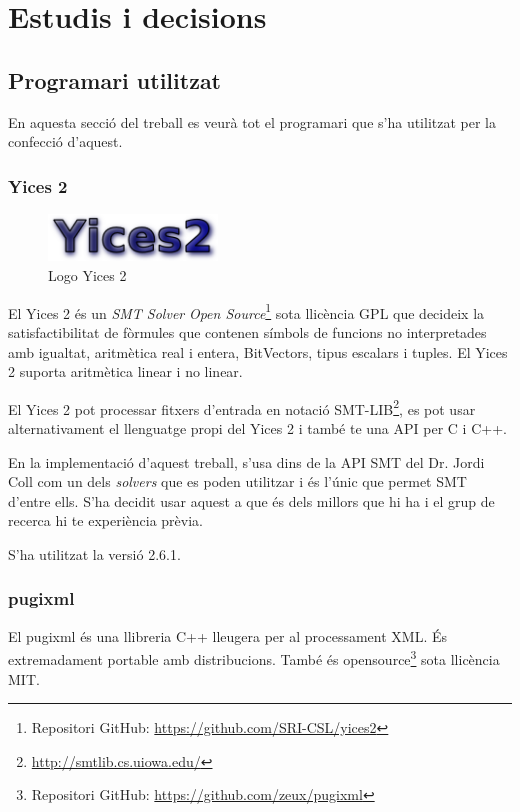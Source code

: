 \documentclass[11pt,a4paper,twoside]{report}
\begin{document}
  \chapter{Estudis i decisions}
  \section{Programari utilitzat}
  En aquesta secció del treball es veurà tot el programari que s'ha utilitzat per la confecció d'aquest.
  \subsection{Yices 2}
  \begin{figure}[ht!]
    \centering
    \includegraphics[width=0.4\textwidth]{Diagrames/logoYices.png}
    \caption{Logo Yices 2}
    \label{fig:yices}
  \end{figure}
  El Yices 2 és un \textit{SMT Solver} \textit{Open Source}\footnote{Repositori GitHub: \url{https://github.com/SRI-CSL/yices2}} sota llicència GPL que decideix la satisfactibilitat de fòrmules que contenen símbols de funcions no interpretades amb igualtat, aritmètica real i entera, BitVectors, tipus escalars i tuples. El Yices 2 suporta aritmètica linear i no linear.
  
  El Yices 2 pot processar fitxers d'entrada en notació SMT-LIB\footnote{\url{http://smtlib.cs.uiowa.edu/}}, es pot usar alternativament el llenguatge propi del Yices 2 i també te una API per C i C++.
  
  En la implementació d'aquest treball, s'usa dins de la API SMT del Dr. Jordi Coll com un dels \textit{solvers} que es poden utilitzar i és l'únic que permet SMT d'entre ells. S'ha decidit usar aquest a que és dels millors que hi ha i el grup de recerca hi te experiència prèvia. 

  S'ha utilitzat la versió 2.6.1.

  \subsection{pugixml}
  El pugixml és una llibreria C++ lleugera per al processament XML. És extremadament portable amb distribucions. També és opensource\footnote{Repositori GitHub: \url{https://github.com/zeux/pugixml}} sota llicència MIT.
\end{document}
